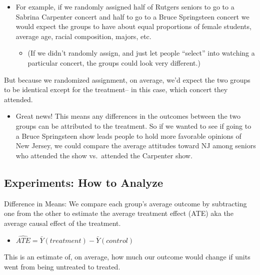 \documentclass[
  letterpaper,
  DIV=11,
  numbers=noendperiod]{scrreprt}
\providecommand{\tightlist}{%
  \setlength{\itemsep}{0pt}\setlength{\parskip}{0pt}}\usepackage{longtable,booktabs,array}
\begin{document}
\begin{itemize}
\tightlist
\item
  For example, if we randomly assigned half of Rutgers seniors to go to
  a Sabrina Carpenter concert and half to go to a Bruce Springsteen
  concert we would expect the groups to have about equal proportions of
  female students, average age, racial composition, majors, etc.

  \begin{itemize}
  \tightlist
  \item
    (If we didn't randomly assign, and just let people ``select'' into
    watching a particular concert, the groups could look very
    different.)
  \end{itemize}
\end{itemize}

But because we randomized assignment, on average, we'd expect the two
groups to be identical except for the treatment-- in this case, which
concert they attended.

\begin{itemize}
\tightlist
\item
  Great news! This means any differences in the outcomes between the two
  groups can be attributed to the treatment. So if we wanted to see if
  going to a Bruce Springsteen show leads people to hold more favorable
  opinions of New Jersey, we could compare the average attitudes toward
  NJ among seniors who attended the show vs.~attended the Carpenter
  show.
\end{itemize}

\hypertarget{experiments-how-to-analyze}{%
\subsection{Experiments: How to
Analyze}\label{experiments-how-to-analyze}}

Difference in Means: We compare each group's average outcome by
subtracting one from the other to estimate the average treatment effect
(ATE) aka the average causal effect of the treatment.

\begin{itemize}
\tightlist
\item
  \(\widehat{ATE} = \bar{Y}(treatment) - \bar{Y}(control)\)
\end{itemize}

This is an estimate of, on average, how much our outcome would change if
units went from being untreated to treated.
\end{document}
